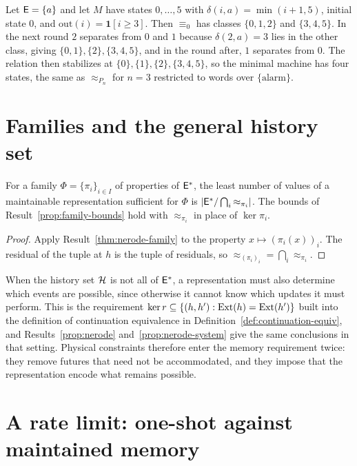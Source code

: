 \begin{example}
Let $\mathsf{E}=\{a\}$ and let $M$ have states $0,\dots,5$ with $\delta(i,a)=\min(i+1,5)$, initial state $0$, and $\mathrm{out}(i)=\mathbf 1[i\ge3]$. Then $\equiv_0$ has classes $\{0,1,2\}$ and $\{3,4,5\}$. In the next round $2$ separates from $0$ and $1$ because $\delta(2,a)=3$ lies in the other class, giving $\{0,1\},\{2\},\{3,4,5\}$, and in the round after, $1$ separates from $0$. The relation then stabilizes at $\{0\},\{1\},\{2\},\{3,4,5\}$, so the minimal machine has four states, the same as $\approx_{P_n}$ for $n=3$ restricted to words over $\{\mathrm{alarm}\}$.
\end{example}

\section{Families and the general history set}\label{sec:restrict}

\begin{established}\label{prop:family-nerode}
For a family $\Phi=\{\pi_i\}_{i\in I}$ of properties of $\mathsf{E}^{*}$, the least number of values of a maintainable representation sufficient for $\Phi$ is $|\mathsf{E}^{*}/\bigcap_i{\approx_{\pi_i}}|$. The bounds of Result~\ref{prop:family-bounds} hold with $\approx_{\pi_i}$ in place of $\ker\pi_i$.
\end{established}
\begin{proof}
Apply Result~\ref{thm:nerode-family} to the property $x\mapsto(\pi_i(x))_i$. The residual of the tuple at $h$ is the tuple of residuals, so $\approx_{(\pi_i)_i}=\bigcap_i\approx_{\pi_i}$.
\end{proof}

When the history set $\mathcal{H}$ is not all of $\mathsf{E}^{*}$, a representation must also determine which events are possible, since otherwise it cannot know which updates it must perform. This is the requirement $\ker r\subseteq\{(h,h'):\operatorname{Ext}(h)=\operatorname{Ext}(h')\}$ built into the definition of continuation equivalence in Definition~\ref{def:continuation-equiv}, and Results~\ref{prop:nerode} and~\ref{prop:nerode-system} give the same conclusions in that setting. Physical constraints therefore enter the memory requirement twice: they remove futures that need not be accommodated, and they impose that the representation encode what remains possible.


\section{A rate limit: one-shot against maintained memory}\label{sec:rate-intro}

